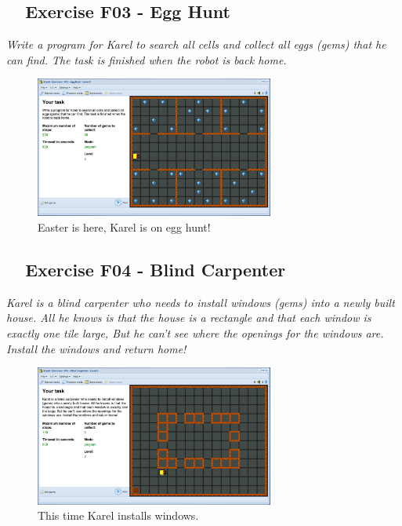 \documentclass[article,A4,12pt]{llncs}
\begin{document}
{{{{\subsection{\ \ Exercise F03 - Egg Hunt}

{\em Write a program for Karel to search all cells and collect all eggs (gems) that he can find. The task is finished when the robot is back home.}


\begin{figure}[!ht]
\begin{center}
\includegraphics[width=0.7\textwidth]{img/f03.png}
\end{center}
\vspace{-4mm}
\caption{Easter is here, Karel is on egg hunt!}
\label{fig:f03}
\vspace{-10mm}
\end{figure}
\noindent

\subsection{\ \ Exercise F04 - Blind Carpenter}

{\em Karel is a blind carpenter who needs to install windows (gems) into a newly built house. All he knows is that the house is a rectangle and that each window is exactly one tile large, But he can't see where the openings for the windows are. Install the windows and return home!}


\begin{figure}[!ht]
\begin{center}
\includegraphics[width=0.7\textwidth]{img/f04.png}
\end{center}
\vspace{-4mm}
\caption{This time Karel installs windows.}
\label{fig:f04}
\end{figure}
\noindent



}}}}
\end{document}
